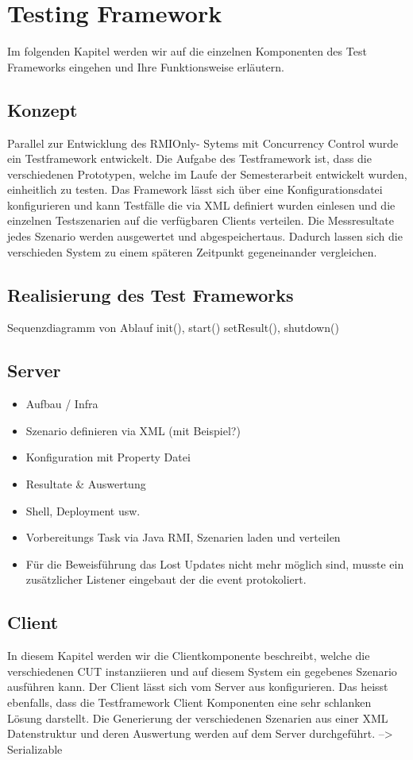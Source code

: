 \section{Testing Framework}
\label{sec:testing Framework}
Im folgenden Kapitel werden wir auf die einzelnen Komponenten des Test Frameworks eingehen und Ihre Funktionsweise erläutern.


\subsection{Konzept}
Parallel zur Entwicklung des RMIOnly- Sytems mit Concurrency Control wurde ein Testframework entwickelt. Die Aufgabe des Testframework ist, dass die verschiedenen Prototypen, welche im Laufe der Semesterarbeit entwickelt wurden, einheitlich zu testen. Das Framework lässt sich über eine Konfigurationsdatei konfigurieren und kann Testfälle die via XML definiert wurden einlesen und die einzelnen Testszenarien auf die verfügbaren Clients verteilen. Die Messresultate jedes Szenario werden ausgewertet und abgespeichertaus. Dadurch lassen sich die verschieden System zu einem späteren Zeitpunkt gegeneinander vergleichen.


\subsection{Realisierung des Test Frameworks}
\label{sec:real test-FW}
Sequenzdiagramm von Ablauf init(), start() setResult(), shutdown()

\subsection{Server}
\label{sec:test-FW Server}
\begin{itemize}
\item Aufbau / Infra
\item Szenario definieren via XML (mit Beispiel?)
\item Konfiguration mit Property Datei
\item Resultate \& Auswertung
\item Shell, Deployment usw.
\item Vorbereitungs Task via Java RMI, Szenarien laden und verteilen
\item Für die Beweisführung das Lost Updates nicht mehr möglich sind, musste ein zusätzlicher Listener eingebaut der die event protokoliert.
\end{itemize}

\subsection{Client}
\label{sec:test-FW Client}
In diesem Kapitel werden wir die Clientkomponente beschreibt, welche die verschiedenen CUT instanziieren und auf diesem System ein gegebenes Szenario ausführen kann. Der Client lässt sich vom Server aus konfigurieren. Das heisst ebenfalls, dass die Testframework Client Komponenten eine sehr schlanken Lösung darstellt. Die Generierung der verschiedenen Szenarien aus einer XML Datenstruktur und deren Auswertung werden auf dem Server durchgeführt. --> Serializable


